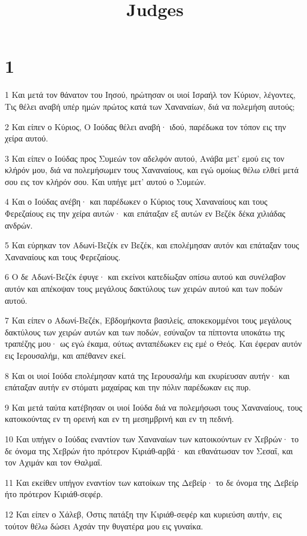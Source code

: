 

\title{Judges}


\chapter{1}

\par 1 Και μετά τον θάνατον του Ιησού, ηρώτησαν οι υιοί Ισραήλ τον Κύριον, λέγοντες, Τις θέλει αναβή υπέρ ημών πρώτος κατά των Χαναναίων, διά να πολεμήση αυτούς;
\par 2 Και είπεν ο Κύριος, Ο Ιούδας θέλει αναβή· ιδού, παρέδωκα τον τόπον εις την χείρα αυτού.
\par 3 Και είπεν ο Ιούδας προς Συμεών τον αδελφόν αυτού, Ανάβα μετ' εμού εις τον κλήρόν μου, διά να πολεμήσωμεν τους Χαναναίους, και εγώ ομοίως θέλω ελθεί μετά σου εις τον κλήρόν σου. Και υπήγε μετ' αυτού ο Συμεών.
\par 4 Και ο Ιούδας ανέβη· και παρέδωκεν ο Κύριος τους Χαναναίους και τους Φερεζαίους εις την χείρα αυτών· και επάταξαν εξ αυτών εν Βεζέκ δέκα χιλιάδας ανδρών.
\par 5 Και εύρηκαν τον Αδωνί-Βεζέκ εν Βεζέκ, και επολέμησαν αυτόν και επάταξαν τους Χαναναίους και τους Φερεζαίους.
\par 6 Ο δε Αδωνί-Βεζέκ έφυγε· και εκείνοι κατεδίωξαν οπίσω αυτού και συνέλαβον αυτόν και απέκοψαν τους μεγάλους δακτύλους των χειρών αυτού και των ποδών αυτού.
\par 7 Και είπεν ο Αδωνί-Βεζέκ, Εβδομήκοντα βασιλείς, αποκεκομμένοι τους μεγάλους δακτύλους των χειρών αυτών και των ποδών, εσύναζον τα πίπτοντα υποκάτω της τραπέζης μου· ως εγώ έκαμα, ούτως ανταπέδωκεν εις εμέ ο Θεός. Και έφεραν αυτόν εις Ιερουσαλήμ, και απέθανεν εκεί.
\par 8 Και οι υιοί Ιούδα επολέμησαν κατά της Ιερουσαλήμ και εκυρίευσαν αυτήν· και επάταξαν αυτήν εν στόματι μαχαίρας και την πόλιν παρέδωκαν εις πυρ.
\par 9 Και μετά ταύτα κατέβησαν οι υιοί Ιούδα διά να πολεμήσωσι τους Χαναναίους, τους κατοικούντας εν τη ορεινή και εν τη μεσημβρινή και εν τη πεδινή.
\par 10 Και υπήγεν ο Ιούδας εναντίον των Χαναναίων των κατοικούντων εν Χεβρών· το δε όνομα της Χεβρών ήτο πρότερον Κιριάθ-αρβά· και εθανάτωσαν τον Σεσαΐ, και τον Αχιμάν και τον Θαλμαΐ.
\par 11 Και εκείθεν υπήγον εναντίον των κατοίκων της Δεβείρ· το δε όνομα της Δεβείρ ήτο πρότερον Κιριάθ-σεφέρ.
\par 12 Και είπεν ο Χάλεβ, Όστις πατάξη την Κιριάθ-σεφέρ και κυριεύση αυτήν, εις τούτον θέλω δώσει Αχσάν την θυγατέρα μου εις γυναίκα.
